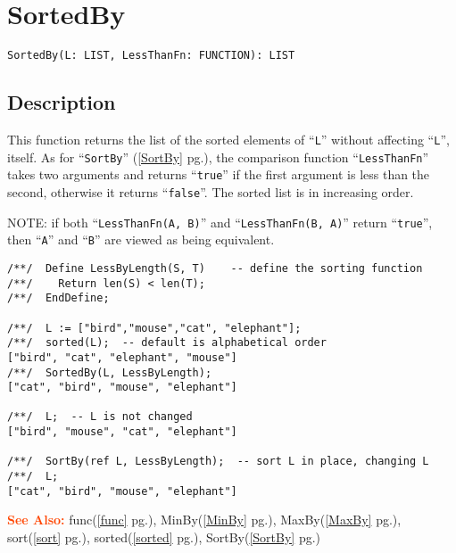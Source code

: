 \documentclass[a4paper]{mybook}
\newenvironment{command}{}{} %
\newcommand\SeeAlso{\par\textcolor{OrangeRed}{\textbf{\large See Also: }}}
\begin{document}
\section{SortedBy}
\label{SortedBy}
\begin{command} %


\begin{Verbatim}[label=syntax, rulecolor=\color{MidnightBlue},
frame=single]
SortedBy(L: LIST, LessThanFn: FUNCTION): LIST
\end{Verbatim}


\subsection*{Description}

This function returns the list of the sorted elements of ``\verb&L&'' without
affecting ``\verb&L&'', itself.  As for ``\verb&SortBy&'' (\ref{SortBy} pg.\pageref{SortBy}), the comparison
function ``\verb&LessThanFn&'' takes two arguments and returns ``\verb&true&'' if the first argument
is less than the second, otherwise it returns ``\verb&false&''.  The sorted list
is in increasing order.
\par 
NOTE: if both ``\verb&LessThanFn(A, B)&'' and ``\verb&LessThanFn(B, A)&'' return
``\verb&true&'', then ``\verb&A&'' and ``\verb&B&'' are viewed as being equivalent.
\begin{Verbatim}[label=example, rulecolor=\color{PineGreen}, frame=single]
/**/  Define LessByLength(S, T)    -- define the sorting function
/**/    Return len(S) < len(T);
/**/  EndDefine;

/**/  L := ["bird","mouse","cat", "elephant"];
/**/  sorted(L);  -- default is alphabetical order
["bird", "cat", "elephant", "mouse"]
/**/  SortedBy(L, LessByLength);
["cat", "bird", "mouse", "elephant"]

/**/  L;  -- L is not changed
["bird", "mouse", "cat", "elephant"]

/**/  SortBy(ref L, LessByLength);  -- sort L in place, changing L
/**/  L;
["cat", "bird", "mouse", "elephant"]
\end{Verbatim}


\SeeAlso %
  func(\ref{func} pg.\pageref{func}), 
    MinBy(\ref{MinBy} pg.\pageref{MinBy}), 
    MaxBy(\ref{MaxBy} pg.\pageref{MaxBy}), 
    sort(\ref{sort} pg.\pageref{sort}), 
    sorted(\ref{sorted} pg.\pageref{sorted}), 
    SortBy(\ref{SortBy} pg.\pageref{SortBy})
\end{command} %
\end{document}
